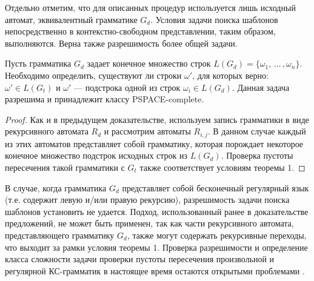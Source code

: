 Отдельно отметим, что для описанных процедур используется лишь исходный автомат, эквивалентный грамматике $G_d$. 
Условия задачи поиска шаблонов непосредственно в контекстно-свободном представлении, таким образом, выполняются. 
Верна также разрешимость более общей задачи.

\begin{prop}
	Пусть грамматика $G_d$ задает конечное множество строк $L(G_d) = \{\omega_1, \, \dots \, , \omega_n \}$. Необходимо определить, существуют ли строки $\omega'$, для которых верно: $\omega' \in L(G_t)$ и $\omega'$ --- подстрока одной из строк $\omega_i \in L(G_d)$. Данная задача разрешима и принадлежит классу PSPACE-complete.
\end{prop}

\begin{proof}
	Как и в предыдущем доказательстве, используем запись грамматики в виде рекурсивного автомата $R_d$ и рассмотрим автоматы $R_{i, j}$. В данном случае каждый из этих автоматов представляет собой грамматику, которая порождает некоторое конечное множество подстрок исходных строк из $L(G_d)$. Проверка пустоты пересечения такой грамматики с $G_t$ также соответствует условиям теоремы 1.
\end{proof}

В случае, когда грамматика $G_d$ представляет собой бесконечный регулярный язык (т.е. содержит левую и/или правую рекурсию), разрешимость задачи поиска шаблонов установить не удается. Подход, использованный ранее в доказательстве предложений, не может быть применен, так как части рекурсивного автомата, представляющего грамматику $G_d$, также могут содержать рекурсивные переходы, что выходит за рамки условия теоремы 1. Проверка разрешимости и определение класса сложности задачи проверки пустоты пересечения произвольной и регулярной КС-грамматик в настоящее время остаются открытыми проблемами \cite{Nederhof}.
